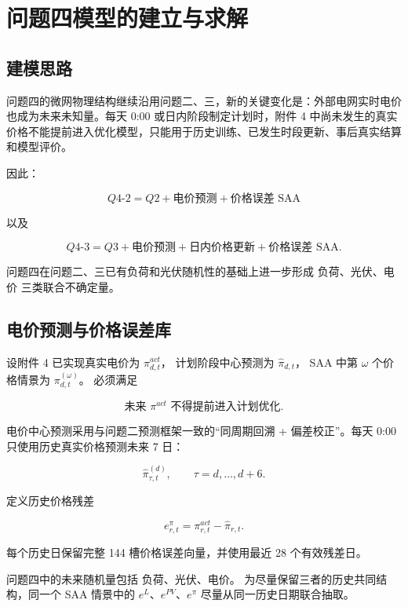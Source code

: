 \section{问题四模型的建立与求解}

\subsection{建模思路}

问题四的微网物理结构继续沿用问题二、三，新的关键变化是：外部电网实时电价也成为未来未知量。每天 0:00 或日内阶段制定计划时，附件 4 中尚未发生的真实价格不能提前进入优化模型，只能用于历史训练、已发生时段更新、事后真实结算和模型评价。

因此：

\[
\boxed{
Q4\text{-}2
=
Q2
+
\text{电价预测}
+
\text{价格误差 SAA}
}
\]

以及

\[
\boxed{
Q4\text{-}3
=
Q3
+
\text{电价预测}
+
\text{日内价格更新}
+
\text{价格误差 SAA}
}.
\]

问题四在问题二、三已有负荷和光伏随机性的基础上进一步形成 负荷、光伏、电价 三类联合不确定量。

\subsection{电价预测与价格误差库}

设附件 4 已实现真实电价为 \(\pi^{act}_{d,t}\)， 计划阶段中心预测为 \(\hat\pi_{d,t}\)， SAA 中第 \(\omega\) 个价格情景为 \(\pi^{(\omega)}_{d,t}\)。 必须满足

\begin{equation}
\boxed{
\text{未来 }\pi^{act}\text{ 不得提前进入计划优化}
}.
\end{equation}

电价中心预测采用与问题二预测框架一致的“同周期回溯 + 偏差校正”。每天 0:00 只使用历史真实价格预测未来 7 日：

\begin{equation}
\hat\pi_{\tau,t}^{(d)},
\qquad
\tau=d,\ldots,d+6.
\end{equation}

定义历史价格残差

\begin{equation}
e^\pi_{r,t}
=
\pi^{act}_{r,t}
-
\hat\pi_{r,t}.
\end{equation}

每个历史日保留完整 144 槽价格误差向量，并使用最近 28 个有效残差日。

问题四中的未来随机量包括 负荷、光伏、电价。 为尽量保留三者的历史共同结构，同一个 SAA 情景中的 \(e^L\)、\(e^{PV}\)、\(e^\pi\) 尽量从同一历史日期联合抽取。

